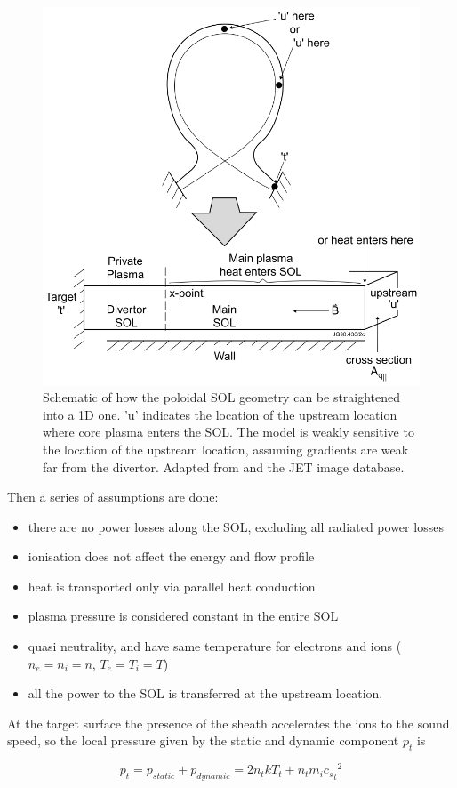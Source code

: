 \begin{figure}[!ht]
	\centering
	\includegraphics[trim={0 0 0 0},clip,width=0.65\linewidth]{Chapters/chapter1/figs/2PM.png}
	\caption{Schematic of how the poloidal SOL geometry can be straightened into a 1D one. 'u' indicates the location of the upstream location where core plasma enters the SOL. The model is weakly sensitive to the location of the upstream location, assuming gradients are weak far from the divertor.\cite{Verhaegh2018} Adapted from \cite{Harrison2011} and the JET image database.}
	\label{fig:2PM}
\end{figure}

Then a series of assumptions are done:
\begin{itemize}
    \item there are no power losses along the SOL, excluding all radiated power losses
    \item ionisation does not affect the energy and flow profile
    \item heat is transported only via parallel heat conduction
    \item plasma pressure is considered constant in the entire SOL
    \item quasi neutrality, and have same temperature for electrons and ions ($n_e = n_i = n$, $T_e = T_i = T$)
    \item all the power to the SOL is transferred at the upstream location.
\end{itemize}

At the target surface the presence of the sheath accelerates the ions to the sound speed, so the local pressure given by the static and dynamic component $p_t$ is

\begin{equation}
p_{t} = p_{static} + p_{dynamic} = 2n_{t} k T_{t} + n_{t} m_i {{c_s}_t}^2
\label{eq:2pm1}
\end{equation}

